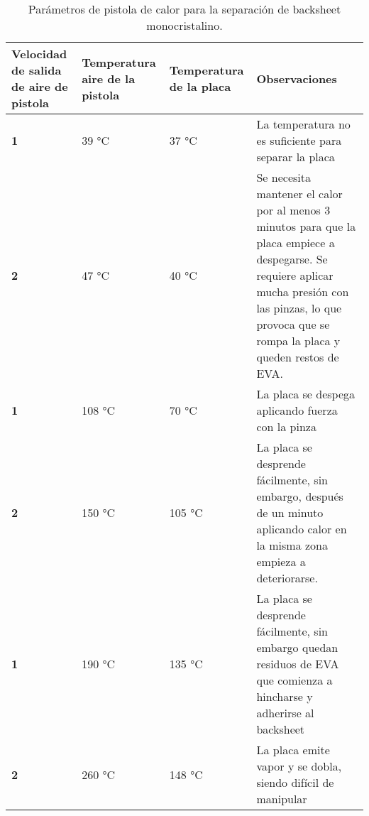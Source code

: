 \begin{table}[htb]
	\caption{Parámetros de pistola de calor para la separación de backsheet monocristalino.}
	\vspace{-0.5em} %
	\label{tab:PistolaMono}
	\begin{center}
		\begin{tabular}{|p{2cm}||p{3cm}|p{3cm}|p{4cm}|}\hline
			\textbf{Velocidad de salida de aire de pistola} & \textbf{Temperatura aire de la pistola} & \textbf{Temperatura de la placa}&\textbf{Observaciones}\\ \hline
			\textbf{1} & 39 °C & 37 °C & La temperatura no es suficiente para separar la placa \\ \hline
			\textbf{2} & 47 °C & 40 °C & Se necesita mantener el calor por al menos 3 minutos para que la placa empiece a despegarse. Se requiere aplicar mucha presión con las pinzas, lo que provoca que se rompa la placa y queden restos de EVA.\\ \hline
			\textbf{1} & 108 °C & 70 °C & La placa se despega aplicando fuerza con la pinza\\ \hline
			\textbf{2} & 150 °C & 105 °C & La placa se desprende fácilmente, sin embargo, después de un minuto aplicando calor en la misma zona empieza a deteriorarse.\\ \hline
			\textbf{1} & 190 °C & 135 °C & La placa se desprende fácilmente, sin embargo quedan residuos de EVA que comienza a hincharse y adherirse al backsheet\\ \hline	
			\textbf{2} & 260 °C & 148 °C & La placa emite vapor y se dobla, siendo difícil de manipular\\ \hline
		\end{tabular}
	\end{center}
\end{table} 
\clearpage

